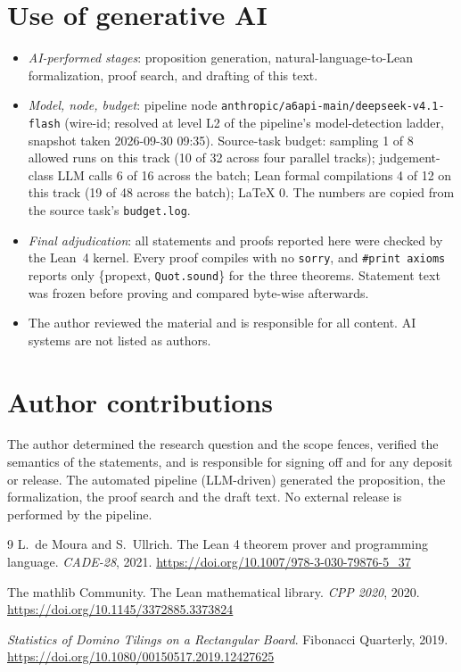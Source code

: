 \documentclass[11pt]{article}
\begin{document}
\section*{Use of generative AI}
\begin{itemize}
\item \emph{AI-performed stages}: proposition generation, natural-language-to-Lean
formalization, proof search, and drafting of this text.
\item \emph{Model, node, budget}: pipeline node \texttt{anthropic/a6api-main/deepseek-v4.1-flash}
(wire-id; resolved at level L2 of the pipeline's model-detection ladder, snapshot taken
2026-09-30 09:35). Source-task budget: sampling 1 of 8 allowed runs on this track (10 of 32
across four parallel tracks); judgement-class LLM calls 6 of 16 across the batch; Lean
formal compilations 4 of 12 on this track (19 of 48 across the batch); LaTeX 0. The numbers are
copied from the source task's \texttt{budget.log}.
\item \emph{Final adjudication}: all statements and proofs reported here were checked by the
Lean~4 kernel. Every proof compiles with no \texttt{sorry}, and \texttt{\#print axioms}
reports only \{propext, \texttt{Quot.sound}\} for the three theorems. Statement text was
frozen before proving and compared byte-wise afterwards.
\item The author reviewed the material and is responsible for all content. AI systems are
not listed as authors.
\end{itemize}

\section*{Author contributions}
The author determined the research question and the scope fences, verified the semantics of
the statements, and is responsible for signing off and for any deposit or release. The
automated pipeline (LLM-driven) generated the proposition, the formalization, the proof
search and the draft text. No external release is performed by the pipeline.

\begin{thebibliography}{9}
L.~de Moura and S.~Ullrich.
\newblock The Lean 4 theorem prover and programming language.
\newblock \emph{CADE-28}, 2021. \url{https://doi.org/10.1007/978-3-030-79876-5_37}

The mathlib Community.
\newblock The Lean mathematical library.
\newblock \emph{CPP 2020}, 2020. \url{https://doi.org/10.1145/3372885.3373824}

\emph{Statistics of Domino Tilings on a Rectangular Board}.
\newblock Fibonacci Quarterly, 2019.
\newblock \url{https://doi.org/10.1080/00150517.2019.12427625}
\end{thebibliography}
\end{document}
